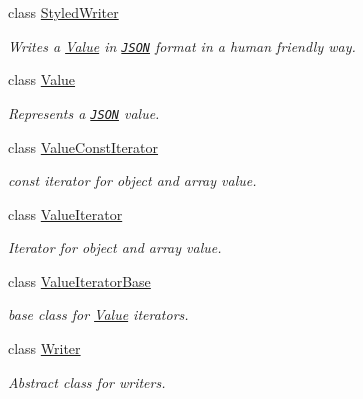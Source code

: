 \begin{DoxyCompactItemize}
class \hyperlink{class_json_1_1_styled_writer}{Styled\+Writer}
\begin{DoxyCompactList}\small\item\em Writes a \hyperlink{class_json_1_1_value}{Value} in \href{http://www.json.org}{\tt J\+S\+ON} format in a human friendly way. \end{DoxyCompactList}\item 
class \hyperlink{class_json_1_1_value}{Value}
\begin{DoxyCompactList}\small\item\em Represents a \href{http://www.json.org}{\tt J\+S\+ON} value. \end{DoxyCompactList}\item 
class \hyperlink{class_json_1_1_value_const_iterator}{Value\+Const\+Iterator}
\begin{DoxyCompactList}\small\item\em const iterator for object and array value. \end{DoxyCompactList}\item 
class \hyperlink{class_json_1_1_value_iterator}{Value\+Iterator}
\begin{DoxyCompactList}\small\item\em Iterator for object and array value. \end{DoxyCompactList}\item 
class \hyperlink{class_json_1_1_value_iterator_base}{Value\+Iterator\+Base}
\begin{DoxyCompactList}\small\item\em base class for \hyperlink{class_json_1_1_value}{Value} iterators. \end{DoxyCompactList}\item 
class \hyperlink{class_json_1_1_writer}{Writer}
\begin{DoxyCompactList}\small\item\em Abstract class for writers. \end{DoxyCompactList}\end{DoxyCompactItemize}
